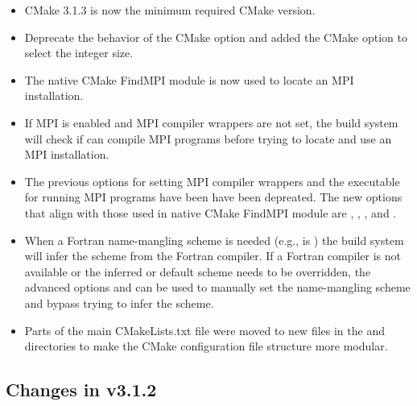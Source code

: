 \begin{itemize}
\item CMake 3.1.3 is now the minimum required CMake version.
\item Deprecate the behavior of the  CMake option and
  added the \newline 
   CMake option to select the 
  integer size.
\item The native CMake FindMPI module is now used to locate an MPI installation.
\item If MPI is enabled and MPI compiler wrappers are not set, the build system 
  will check if  can compile MPI programs before
  trying to locate and use an MPI installation.
\item The previous options for setting MPI compiler wrappers and the executable
  for running MPI programs have been have been depreated. The new options that
  align with those used in native CMake FindMPI module are
  , , ,
  and .
\item When a Fortran name-mangling scheme is needed (e.g., 
  is ) the build system will infer the scheme from the Fortran
  compiler. If a Fortran compiler is not available or the inferred or default
  scheme needs to be overridden, the advanced options
   and  can
  be used to manually set the name-mangling scheme and bypass trying to infer
  the scheme. 
\item Parts of the main CMakeLists.txt file were moved to new files in the
   and  directories to make the CMake configuration file
  structure more modular.
\end{itemize}

\subsection*{Changes in v3.1.2}

